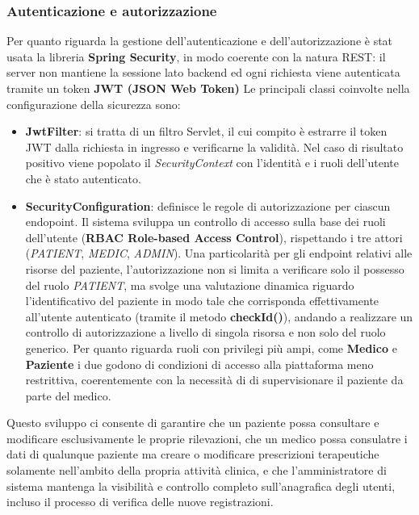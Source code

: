 \documentclass{article}
\begin{document}
\subsubsection{Autenticazione e autorizzazione}
Per quanto riguarda la gestione dell'autenticazione e dell'autorizzazione è stat usata la libreria \textbf{Spring Security},
in modo coerente con la natura REST: il server non mantiene la sessione lato backend ed ogni richiesta viene autenticata tramite un token \textbf{JWT (JSON Web Token)}
\vspace{1em}
\noindent
\newline
Le principali classi coinvolte nella configurazione della sicurezza sono:
\begin{itemize}
   \item \textbf{JwtFilter}: si tratta di un filtro Servlet, il cui compito è estrarre il token JWT dalla richiesta in ingresso e verificarne la validità. Nel caso
       di risultato positivo viene popolato il \textit{SecurityContext} con l'identità e i ruoli dell'utente che è stato autenticato.
   \item \textbf{SecurityConfiguration}: definisce le regole di autorizzazione per ciascun endopoint. Il sistema sviluppa un controllo di accesso sulla base dei ruoli dell'utente
       (\textbf{RBAC Role-based Access Control}), rispettando i tre attori (\textit{PATIENT}, \textit{MEDIC}, \textit{ADMIN}).
       Una particolarità per gli endpoint relativi alle risorse del paziente, l'autorizzazione non si limita a verificare solo il possesso del ruolo \textit{PATIENT},
       ma svolge una valutazione dinamica riguardo l'identificativo del paziente in modo tale che corrisponda effettivamente all'utente autenticato (tramite il metodo \textbf{checkId()}),
       andando a realizzare un controllo di autorizzazione a livello di singola risorsa e non solo del ruolo generico. Per quanto riguarda ruoli con privilegi più ampi, come \textbf{Medico} e \textbf{Paziente}
       i due godono di condizioni di accesso alla piattaforma meno restrittiva, coerentemente con la necessità di di supervisionare il paziente da parte del medico.
\end{itemize}
Questo sviluppo ci consente di garantire che un paziente possa consultare e modificare esclusivamente le proprie rilevazioni, che un medico possa consulatre i dati
di qualunque paziente ma creare o modificare prescrizioni terapeutiche solamente nell'ambito della propria attività clinica, e che l'amministratore di sistema mantenga la visibilità e controllo completo sull'anagrafica
degli utenti, incluso il processo di verifica delle nuove registrazioni.
\end{document}
